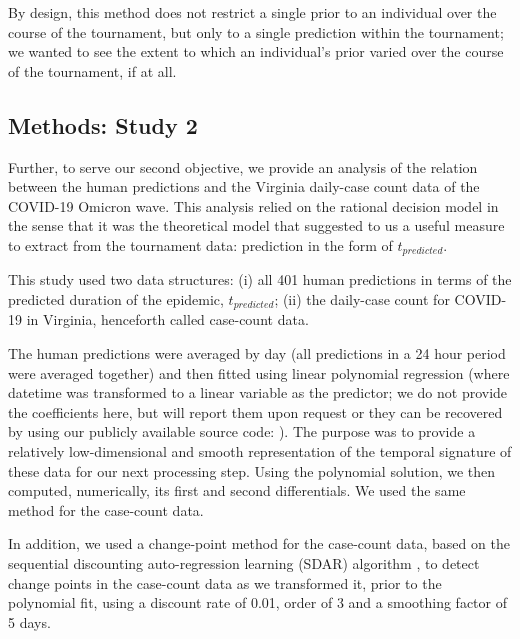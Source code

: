 By design, this method does not restrict a single prior to an individual over the course of the tournament, but only to a single prediction within the tournament; we wanted to see the extent to which an individual's prior varied over the course of the tournament, if at all.  

\subsection{Methods: Study 2}
Further, to serve our second objective, we provide an analysis of the relation between the human predictions and the Virginia daily-case count data of the COVID-19 Omicron wave.  This analysis relied on the rational decision model in the sense that it was the theoretical model that suggested to us a useful measure to extract from the tournament data: prediction in the form of $t_{predicted}$.  

This study used two data structures: (i) all 401 human predictions in terms of the predicted duration of the epidemic, $t_{predicted}$; (ii) the daily-case count for COVID-19 in Virginia, henceforth called case-count data.  

The human predictions were averaged by day (all predictions in a 24 hour period were averaged together) and then fitted using linear polynomial regression (where datetime was transformed to a linear variable as the predictor; we do not provide the coefficients here, but will report them upon request or they can be recovered by using our publicly available source code: \cite{orrgit}).  The purpose was to provide a relatively low-dimensional and smooth representation of the temporal signature of these data for our next processing step. Using the polynomial solution, we then computed, numerically, its first and second differentials.  We used the same method for the case-count data. 

In addition, we used a change-point method for the case-count data, based on the sequential discounting auto-regression learning (SDAR) algorithm \citep{Yamanishi2002}, to detect change points in the case-count data as we transformed it, prior to the polynomial fit, using a discount rate of 0.01, order of 3 and a smoothing factor of 5 days. 